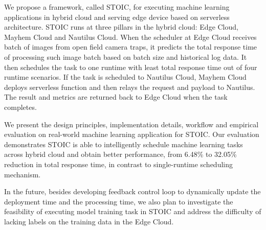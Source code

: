 We propose a framework, called STOIC, for executing machine learning applications in hybrid cloud and serving edge device based on serverless architecture. STOIC runs at three pillars in the hybrid cloud: Edge Cloud, Mayhem Cloud and Nautilus Cloud. When the scheduler at Edge Cloud receives batch of images from open field camera traps, it predicts the total response time of processing such image batch based on batch size and historical log data. It then schedules the task to one runtime with least total response time out of four runtime scenarios. If the task is scheduled to Nautilus Cloud, Mayhem Cloud deploys serverless function and then relays the request and payload to Nautilus. The result and metrics are returned back to Edge Cloud when the task completes.

We present the design principles, implementation details, workflow and empirical evaluation on real-world machine learning application for STOIC. Our evaluation demonstrates STOIC is able to intelligently schedule machine learning tasks across hybrid cloud and obtain better performance, from 6.48\% to 32.05\% reduction in total response time, in contrast to single-runtime scheduling mechanism.

In the future, besides developing feedback control loop to dynamically update the deployment time and the processing time, we also plan to investigate the feasibility of executing model training task in STOIC and address the difficulty of lacking labels on the training data in the Edge Cloud.